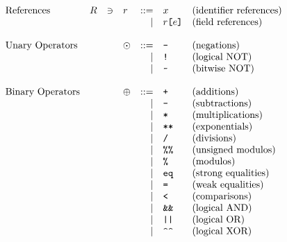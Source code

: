 \[
  \begin{array}{lrclrll}
    \text{References} & \refset &\ni& \refer &
    ::= & \id                                                   & \text{(identifier references)}\\
    &&&&\mid& \refer \C{[} \expr \C{]}                          & \text{(field references)}\\
    \\
    \text{Unary Operators} &&& \uop &
    ::= & \C{-}                                                 & \text{(negations)}\\
    &&&&\mid& \C{!}                                             & \text{(logical NOT)}\\
    &&&&\mid& \C{\char`~}                                       & \text{(bitwise NOT)}\\
    \\
    \text{Binary Operators} &&& \bop &
    ::= & \C{+}                                                 & \text{(additions)}\\
    &&&&\mid& \C{-}                                             & \text{(subtractions)}\\
    &&&&\mid& \C{*}                                             & \text{(multiplications)}\\
    &&&&\mid& \C{**}                                            & \text{(exponentials)}\\
    &&&&\mid& \C{/}                                             & \text{(divisions)}\\
    &&&&\mid& \C{\%\%}                                          & \text{(unsigned modulos)}\\
    &&&&\mid& \C{\%}                                            & \text{(modulos)}\\
    &&&&\mid& \C{eq}                                            & \text{(strong equalities)}\\
    &&&&\mid& \C{=}                                             & \text{(weak equalities)}\\
    &&&&\mid& \C{<}                                             & \text{(comparisons)}\\
    &&&&\mid& \C{\&\&}                                          & \text{(logical AND)}\\
    &&&&\mid& \C{||}                                            & \text{(logical OR)}\\
    &&&&\mid& \C{\char`^\char`^}                                & \text{(logical XOR)}\\

\end{array}\]
